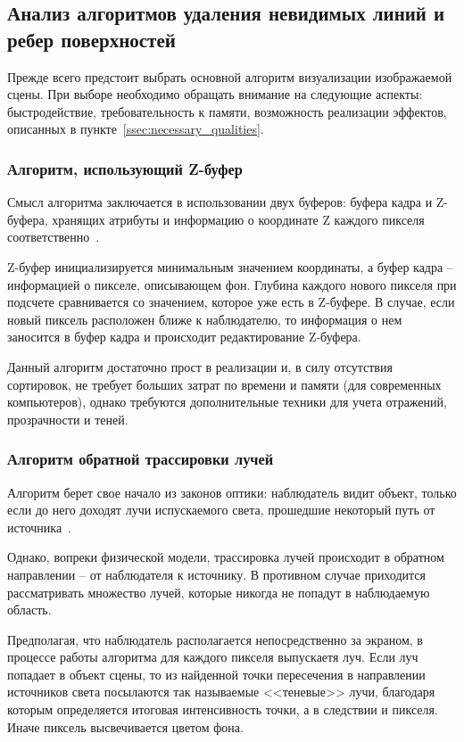 \subsection{Анализ алгоритмов удаления невидимых линий и ребер поверхностей}
Прежде всего предстоит выбрать основной алгоритм визуализации изображаемой
сцены. При выборе необходимо обращать внимание на следующие аспекты:
быстродействие, требовательность к памяти, возможность реализации эффектов,
описанных в пункте~\ref{ssec:necessary_qualities}.

\subsubsection{Алгоритм, использующий Z-буфер}
Смысл алгоритма заключается в использовании двух буферов: буфера кадра и
Z-буфера, хранящих атрибуты и информацию о координате Z каждого пикселя
соответственно~\cite{ZBuffer}.

Z-буфер инициализируется минимальным значением координаты, а буфер
кадра -- информацией о пикселе, описывающем фон. Глубина каждого нового
пикселя при подсчете сравнивается со значением, которое уже есть в Z-буфере. В
случае, если новый пиксель расположен ближе к наблюдателю, то информация о
нем заносится в буфер кадра и происходит редактирование Z-буфера.

Данный алгоритм достаточно прост в реализации и, в силу отсутствия
сортировок, не требует больших затрат по времени и памяти (для современных
компьютеров), однако требуются дополнительные техники для учета отражений,
прозрачности и теней.

\subsubsection{Алгоритм обратной трассировки лучей}
Алгоритм берет свое начало из законов оптики: наблюдатель видит объект,
только если до него доходят лучи испускаемого света, прошедшие некоторый путь
от источника~\cite{RayTracing}.

Однако, вопреки физической модели, трассировка лучей происходит в
обратном направлении -- от наблюдателя к источнику. В противном случае
приходится рассматривать множество лучей, которые никогда не попадут в
наблюдаемую область.

Предполагая, что наблюдатель располагается непосредственно за экраном,
в процессе работы алгоритма для каждого пикселя выпускаетя луч. Если луч
попадает в объект сцены, то из найденной точки пересечения в направлении
источников света посылаются так называемые <<теневые>> лучи, благодаря которым
определяется итоговая интенсивность точки, а в следствии и пикселя. Иначе
пиксель высвечивается цветом фона.

